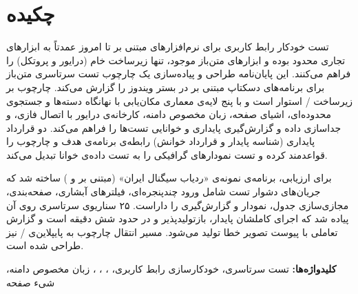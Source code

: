 \chapter*{چکیده}

تست خودکار رابط کاربری برای نرم‌افزارهای مبتنی بر
تا امروز عمدتاً به ابزارهای تجاری محدود بوده و ابزارهای متن‌باز موجود، تنها زیرساخت خام (درایور و پروتکل) را فراهم می‌کنند. این پایان‌نامه طراحی و پیاده‌سازی یک چارچوب تست سرتاسری
متن‌باز برای برنامه‌های دسکتاپ مبتنی بر
در بستر ویندوز را گزارش می‌کند. چارچوب بر زیرساخت
/
استوار است و با پنج لایه‌ی معماری \pdash{} مکان‌یابی با نهانگاه دسته‌ها و جستجوی محدوده‌ای، اشیای صفحه، زبان مخصوص دامنه، کارخانه‌ی درایور با اتصال فازی، و جداسازی داده و گزارش‌گیری \pdash{} پایداری و خوانایی تست‌ها را فراهم می‌کند. دو قرارداد پایداری (شناسه پایدار و قرارداد خوانش) رابطه‌ی برنامه‌ی هدف و چارچوب را قواعد‌مند کرده و تست نمودارهای گرافیکی را به تست داده‌ی خوانا تبدیل می‌کند.

برای ارزیابی، برنامه‌ی نمونه‌ی «ردیاب سیگنال ایران» (مبتنی بر
و
)
ساخته شد که جریان‌های دشوار تست شامل ورود چندپنجره‌ای، فیلترهای آبشاری، صفحه‌بندی، مجازی‌سازی جدول، نمودار و گزارش‌گیری را داراست. ۲۵ سناریوی سرتاسری روی آن پیاده شد که اجرای کاملشان پایدار، بازتولیدپذیر و در حدود شش دقیقه است و گزارش تعاملی
با پیوست تصویر خطا تولید می‌شود. مسیر انتقال چارچوب به پایپلاین‌ی
/
نیز طراحی شده است.

\textbf{کلیدواژه‌ها:} تست سرتاسری، خودکارسازی رابط کاربری، ، ، ، زبان مخصوص دامنه، شیء صفحه
